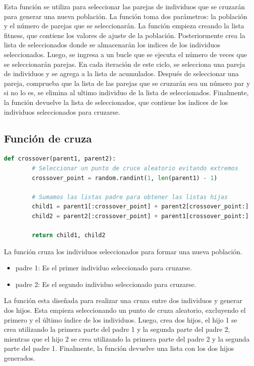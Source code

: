 \documentclass{report}
\begin{document}
    Esta función se utiliza para seleccionar las parejas de individuos que se cruzarán para generar una nueva población. La función toma dos parámetros: la población y el número de parejas que se seleccionarán.
    La función empieza creando la lista fitness, que contiene los valores de ajuste de la población. Posteriormente crea la lista de seleccionados donde se almacenarán los indices de los individuos seleccionados.
    Luego, se ingresa a un bucle que se ejecuta el número de veces que se seleccionarán parejas. En cada iteración de este ciclo, se selecciona una pareja de individuos y se agrega a la lista de acumulados.
    Después de seleccionar una pareja, comprueba que la lista de las parejas que se cruzarán sea un número par y si no lo es, se elimina al ultimo individuo de la lista de seleccionados.
    Finalmente, la función devuelve la lista de seleccionados, que contiene los índices de los individuos seleccionados para cruzarse.
    
    \newpage
    \subsection*{Función de cruza}
    \begin{lstlisting}[language=Python, style=mystyle, caption={Funcion cruza}]
    def crossover(parent1, parent2):
        # Seleccionar un punto de cruce aleatorio evitando extremos
        crossover_point = random.randint(1, len(parent1) - 1)
    
        # Sumamos las listas padre para obtener las listas hijas
        child1 = parent1[:crossover_point] + parent2[crossover_point:]
        child2 = parent2[:crossover_point] + parent1[crossover_point:]
    
        return child1, child2
    \end{lstlisting}

    La función cruza los individuos seleccionados para formar una nueva población.

    \begin{itemize}
        \item padre 1: Es el primer individuo seleccionado para cruzarse.
        \item padre 2: Es el segundo individuo seleccionado para cruzarse.
    \end{itemize}

    La función esta diseñada para realizar una cruza entre dos individuos y generar dos hijos. 
    Esta empieza seleccionando un punto de cruza aleatorio, excluyendo el primero y el último índice de los individuos.
    Luego, crea dos hijos, el hijo 1 se crea utilizando la primera parte del padre 1 y la segunda parte del padre 2, 
    mientras que el hijo 2 se crea utilizando la primera parte del padre 2 y la segunda parte del padre 1.
    Finalmente, la función devuelve una lista con los dos hijos generados.
\end{document}
